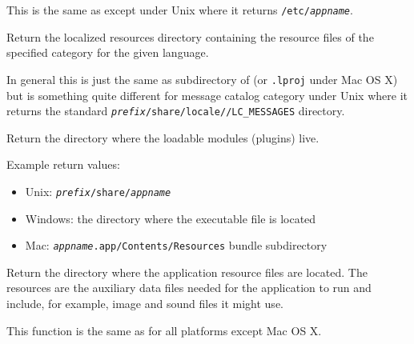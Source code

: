 This is the same as  except
under Unix where it returns \texttt{/etc/\textit{appname}}.


\label{wxstandardpathsgetlocalizedresourcesdir}


Return the localized resources directory containing the resource files of the
specified category for the given language.

In general this is just the same as  subdirectory of
 (or
\texttt{.lproj} under Mac OS X) but is something quite
different for message catalog category under Unix where it returns the standard
\texttt{\textit{prefix}/share/locale//LC\_MESSAGES} directory.



\label{wxstandardpathsgetpluginsdir}


Return the directory where the loadable modules (plugins) live.

Example return values:
\begin{itemize}
    \item Unix: \texttt{\textit{prefix}/share/\textit{appname}}
    \item Windows: the directory where the executable file is located
    \item Mac: \texttt{\textit{appname}.app/Contents/Resources} bundle subdirectory
\end{itemize}




\label{wxstandardpathsgetresourcesdir}


Return the directory where the application resource files are located. The
resources are the auxiliary data files needed for the application to run and
include, for example, image and sound files it might use.

This function is the same as  for
all platforms except Mac OS X.

